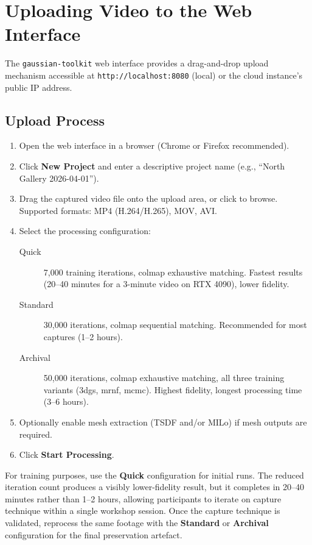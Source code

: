 \section{Uploading Video to the Web Interface}
\label{sec:proc-upload}

The \texttt{gaussian-toolkit} web interface provides a drag-and-drop upload mechanism accessible at \texttt{http://localhost:8080} (local) or the cloud instance's public IP address.

\subsection{Upload Process}

\begin{enumerate}
  \item Open the web interface in a browser (Chrome or Firefox recommended).
  \item Click \textbf{New Project} and enter a descriptive project name (e.g., ``North Gallery 2026-04-01'').
  \item Drag the captured video file onto the upload area, or click to browse. Supported formats: MP4 (H.264/H.265), MOV, AVI.
  \item Select the processing configuration:
    \begin{description}
      \item[Quick] 7,000 training iterations, \acrshort{colmap} exhaustive matching. Fastest results (20--40 minutes for a 3-minute video on RTX 4090), lower fidelity.
      \item[Standard] 30,000 iterations, \acrshort{colmap} sequential matching. Recommended for most captures (1--2 hours).
      \item[Archival] 50,000 iterations, \acrshort{colmap} exhaustive matching, all three training variants (\acrshort{3dgs}, \acrshort{mrnf}, \acrshort{mcmc}). Highest fidelity, longest processing time (3--6 hours).
    \end{description}
  \item Optionally enable mesh extraction (TSDF and/or MILo) if mesh outputs are required.
  \item Click \textbf{Start Processing}.
\end{enumerate}

\begin{recommendation}
For training purposes, use the \textbf{Quick} configuration for initial runs. The reduced iteration count produces a visibly lower-fidelity result, but it completes in 20--40 minutes rather than 1--2 hours, allowing participants to iterate on capture technique within a single workshop session. Once the capture technique is validated, reprocess the same footage with the \textbf{Standard} or \textbf{Archival} configuration for the final preservation artefact.
\end{recommendation}

